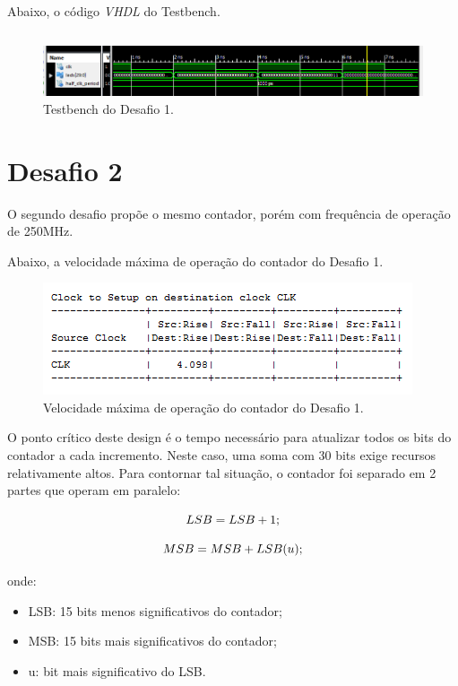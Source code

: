 \documentclass[12pt]{article}
\begin{document}
Abaixo, o código \emph{VHDL} do Testbench.

\inputminted{vhdl}{tb_desafio1.vhd}

\begin{figure}[!h]
    \centering
    \includegraphics[width=1.0\textwidth]{tb_desafio1.png}
    \caption{Testbench do Desafio 1.}
\end{figure}

\clearpage

\section{Desafio 2}

O segundo desafio propõe o mesmo contador, porém com frequência de operação de 250MHz.

Abaixo, a velocidade máxima de operação do contador do Desafio 1.

\begin{figure}[!h]
    \centering
    \includegraphics[width=.8\textwidth]{time_desafio1.png}
    \caption{Velocidade máxima de operação do contador do Desafio 1.}
\end{figure}

O ponto crítico deste design é o tempo necessário para atualizar todos os bits do contador a cada incremento. Neste caso, uma soma com 30 bits exige recursos relativamente altos.
Para contornar tal situação, o contador foi separado em 2 partes que operam em paralelo:

\begin{equation}
\centering
LSB = LSB + 1;
\end{equation}

\begin{equation}
\centering
MSB = MSB + LSB(u);
\end{equation}

onde:
\begin{itemize}
    \item LSB: 15 bits menos significativos do contador;
    \item MSB: 15 bits mais significativos do contador;
    \item u: bit mais significativo do LSB.
\end{itemize}
\end{document}
